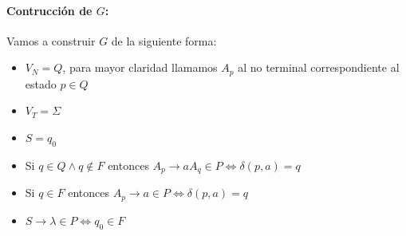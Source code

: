 \paragraph{Contrucción de \(G\):} Vamos a construir \(G\) de la siguiente forma:
\begin{itemize}
  \item \(V_N = Q\), para mayor claridad llamamos \(A_p\) al no terminal correspondiente al estado \(p\in Q\)
  \item \(V_T = \Sigma\)
  \item \(S = q_0\)
  \item Si \(q\in Q \land q\notin F\) entonces \(A_p \rightarrow aA_q \in P \iff \delta(p,a) = q\)
  \item Si \(q\in F\) entonces \(A_p \rightarrow a \in P \iff \delta(p,a) = q\)
  \item \(S\rightarrow \lambda \in P \iff q_0\in F\)
\end{itemize}


